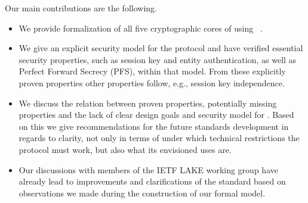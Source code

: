 \documentclass[runningheads, envcountsame, a4paper, draft, x11names]{llncs}
\newcommand{\spacehack}{\vspace{-1em}}
\begin{document}
Our main contributions are the following.
\begin{itemize}
    \item We provide formalization of all five cryptographic cores of \mEdhoc{}
        using \mTamarin~\cite{DBLP:conf/cav/MeierSCB13}.
    \item We give an explicit security model for the protocol and have verified
        essential security properties, such as session key and entity
        authentication, as well as Perfect Forward Secrecy (PFS), within that
        model.
        From these explicitly proven properties other properties follow, e.g.,
        session key independence.
    \item We discuss the relation between proven properties, potentially missing
        properties and the lack of clear design goals and security model for
        \mEdhoc{}.
        Based on this we give recommendations for the future standards
        development in regards to clarity, not only in terms of under which
        technical restrictions the protocol must work, but also what its
        envisioned uses are.
    \item Our discussions with members of the IETF LAKE working group have already
        lead to improvements and clarifications of the standard \mSpec{} based
        on observations we made during the construction of our formal model.
\end{itemize}

\spacehack
\end{document}
